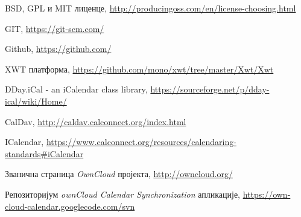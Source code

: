 %
%
\begin{thebibliography}{11}
 {BSD, GPL и MIT лиценце, \url{http://producingoss.com/en/license-choosing.html}}

 {GIT, \url{https://git-scm.com/}}

 {Github, \url{https://github.com/}}

 {XWT платформа, \url{https://github.com/mono/xwt/tree/master/Xwt/Xwt}}

 {DDay.iCal - an iCalendar class library, \url{https://sourceforge.net/p/dday-ical/wiki/Home/}}

 {CalDav, \url{http://caldav.calconnect.org/index.html}}

 {ICalendar, \url{https://www.calconnect.org/resources/calendaring-standards#iCalendar}}

 {Званична страница {\it OwnCloud} пројекта, \url{http://owncloud.org/}}

 {Репозиторијум {\it ownCloud Calendar Synchronization} апликације, \url{https://own-cloud-calendar.googlecode.com/svn}}

\end{thebibliography}

